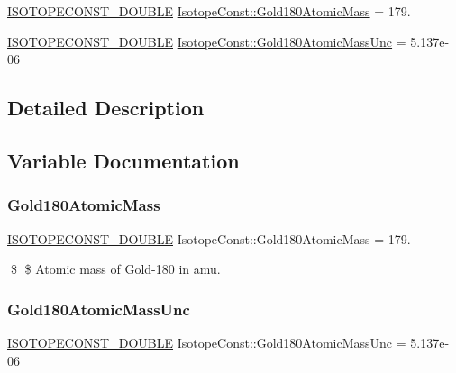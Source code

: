 \begin{DoxyCompactItemize}
\item 
\mbox{\hyperlink{group___isotope_const-_macros_ga8f45a7272ce02c0b4c65c44636ed719a}{I\+S\+O\+T\+O\+P\+E\+C\+O\+N\+S\+T\+\_\+\+D\+O\+U\+B\+LE}} \mbox{\hyperlink{group___isotope_const-_gold-_au180_ga873584c038a88ccd013bb3d73372853f}{Isotope\+Const\+::\+Gold180\+Atomic\+Mass}} = 179.
\item 
\mbox{\hyperlink{group___isotope_const-_macros_ga8f45a7272ce02c0b4c65c44636ed719a}{I\+S\+O\+T\+O\+P\+E\+C\+O\+N\+S\+T\+\_\+\+D\+O\+U\+B\+LE}} \mbox{\hyperlink{group___isotope_const-_gold-_au180_gaeed58a3909ca8cf3b3b0969d81d5c0d1}{Isotope\+Const\+::\+Gold180\+Atomic\+Mass\+Unc}} = 5.\+137e-\/06
\end{DoxyCompactItemize}


\subsection{Detailed Description}


\subsection{Variable Documentation}
\mbox{\label{group___isotope_const-_gold-_au180_ga873584c038a88ccd013bb3d73372853f}} 
\subsubsection{\texorpdfstring{Gold180\+Atomic\+Mass}{Gold180AtomicMass}}
{\footnotesize\ttfamily \mbox{\hyperlink{group___isotope_const-_macros_ga8f45a7272ce02c0b4c65c44636ed719a}{I\+S\+O\+T\+O\+P\+E\+C\+O\+N\+S\+T\+\_\+\+D\+O\+U\+B\+LE}} Isotope\+Const\+::\+Gold180\+Atomic\+Mass = 179.}

\$ \$ Atomic mass of Gold-\/180 in amu. \mbox{\label{group___isotope_const-_gold-_au180_gaeed58a3909ca8cf3b3b0969d81d5c0d1}} 
\subsubsection{\texorpdfstring{Gold180\+Atomic\+Mass\+Unc}{Gold180AtomicMassUnc}}
{\footnotesize\ttfamily \mbox{\hyperlink{group___isotope_const-_macros_ga8f45a7272ce02c0b4c65c44636ed719a}{I\+S\+O\+T\+O\+P\+E\+C\+O\+N\+S\+T\+\_\+\+D\+O\+U\+B\+LE}} Isotope\+Const\+::\+Gold180\+Atomic\+Mass\+Unc = 5.\+137e-\/06}

